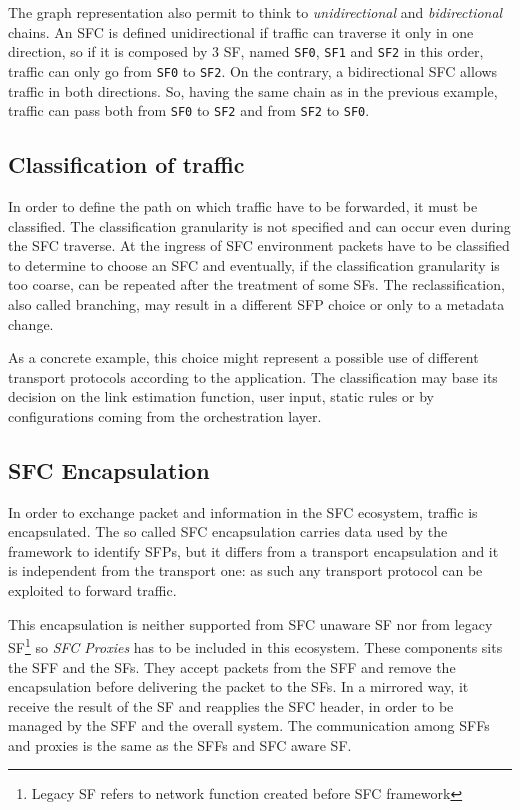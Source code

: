 The graph representation also permit to think to \emph{unidirectional} and
\emph{bidirectional} chains. An SFC is defined unidirectional if traffic can
traverse it only in one direction, so if it is composed by 3 SF, named
\texttt{SF0}, \texttt{SF1} and \texttt{SF2} in this order, traffic can only go
from \texttt{SF0} to \texttt{SF2}. On the contrary, a bidirectional SFC allows
traffic in both directions. So, having the same chain as in the previous
example, traffic can pass both from \texttt{SF0} to \texttt{SF2} and from
\texttt{SF2} to \texttt{SF0}.

\subsection{Classification of traffic}
In order to define the path on which traffic have to be forwarded, it must be
classified. The classification granularity is not specified and can occur even
during the SFC traverse. At the ingress of SFC environment packets have to be
classified to determine to choose an SFC and eventually, if the classification
granularity is too coarse, can be repeated after the treatment of some SFs. The
reclassification, also called branching, may result in a different SFP choice or
only to a metadata change.

As a concrete example, this choice might represent a possible use of different
transport protocols according to the application. The classification may base
its decision on the link estimation function, user input, static rules or
by configurations coming from the orchestration layer.

\subsection{SFC Encapsulation}
In order to exchange packet and information in the SFC ecosystem, traffic is
encapsulated. The so called SFC encapsulation carries data used by the
framework to identify SFPs, but it differs from a transport encapsulation and it
is independent from the transport one: as such any transport protocol can be
exploited to forward traffic.

This encapsulation is neither supported from SFC unaware SF nor from legacy 
SF\footnote{Legacy SF refers to network function created before SFC framework}
so \emph{SFC Proxies} has to be included in this ecosystem. These components
sits the SFF and the SFs. They accept packets from the SFF and remove the
encapsulation before delivering the packet to the SFs. In a mirrored way, it
receive the result of the SF and reapplies the SFC header, in order to be
managed by the SFF and the overall system. The communication among SFFs and
proxies is the same as the SFFs and SFC aware SF.

